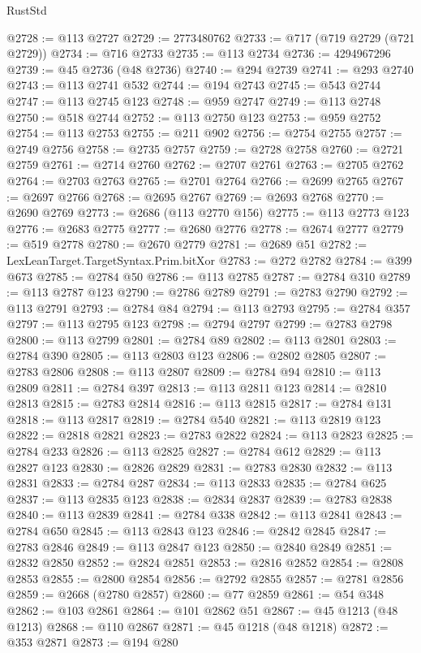 \begin{lexlean}{RustStd}
\begin{coremodule}
@2728 := @113 @2727
@2729 := 2773480762
@2733 := @717 (@719 @2729 (@721 @2729))
@2734 := @716 @2733
@2735 := @113 @2734
@2736 := 4294967296
@2739 := @45 @2736 (@48 @2736)
@2740 := @294 @2739
@2741 := @293 @2740
@2743 := @113 @2741 @532
@2744 := @194 @2743
@2745 := @543 @2744
@2747 := @113 @2745 @123
@2748 := @959 @2747
@2749 := @113 @2748
@2750 := @518 @2744
@2752 := @113 @2750 @123
@2753 := @959 @2752
@2754 := @113 @2753
@2755 := @211 @902
@2756 := @2754 @2755
@2757 := @2749 @2756
@2758 := @2735 @2757
@2759 := @2728 @2758
@2760 := @2721 @2759
@2761 := @2714 @2760
@2762 := @2707 @2761
@2763 := @2705 @2762
@2764 := @2703 @2763
@2765 := @2701 @2764
@2766 := @2699 @2765
@2767 := @2697 @2766
@2768 := @2695 @2767
@2769 := @2693 @2768
@2770 := @2690 @2769
@2773 := @2686 (@113 @2770 @156)
@2775 := @113 @2773 @123
@2776 := @2683 @2775
@2777 := @2680 @2776
@2778 := @2674 @2777
@2779 := @519 @2778
@2780 := @2670 @2779
@2781 := @2689 @51
@2782 := LexLeanTarget.TargetSyntax.Prim.bitXor
@2783 := @272 @2782
@2784 := @399 @673
@2785 := @2784 @50
@2786 := @113 @2785
@2787 := @2784 @310
@2789 := @113 @2787 @123
@2790 := @2786 @2789
@2791 := @2783 @2790
@2792 := @113 @2791
@2793 := @2784 @84
@2794 := @113 @2793
@2795 := @2784 @357
@2797 := @113 @2795 @123
@2798 := @2794 @2797
@2799 := @2783 @2798
@2800 := @113 @2799
@2801 := @2784 @89
@2802 := @113 @2801
@2803 := @2784 @390
@2805 := @113 @2803 @123
@2806 := @2802 @2805
@2807 := @2783 @2806
@2808 := @113 @2807
@2809 := @2784 @94
@2810 := @113 @2809
@2811 := @2784 @397
@2813 := @113 @2811 @123
@2814 := @2810 @2813
@2815 := @2783 @2814
@2816 := @113 @2815
@2817 := @2784 @131
@2818 := @113 @2817
@2819 := @2784 @540
@2821 := @113 @2819 @123
@2822 := @2818 @2821
@2823 := @2783 @2822
@2824 := @113 @2823
@2825 := @2784 @233
@2826 := @113 @2825
@2827 := @2784 @612
@2829 := @113 @2827 @123
@2830 := @2826 @2829
@2831 := @2783 @2830
@2832 := @113 @2831
@2833 := @2784 @287
@2834 := @113 @2833
@2835 := @2784 @625
@2837 := @113 @2835 @123
@2838 := @2834 @2837
@2839 := @2783 @2838
@2840 := @113 @2839
@2841 := @2784 @338
@2842 := @113 @2841
@2843 := @2784 @650
@2845 := @113 @2843 @123
@2846 := @2842 @2845
@2847 := @2783 @2846
@2849 := @113 @2847 @123
@2850 := @2840 @2849
@2851 := @2832 @2850
@2852 := @2824 @2851
@2853 := @2816 @2852
@2854 := @2808 @2853
@2855 := @2800 @2854
@2856 := @2792 @2855
@2857 := @2781 @2856
@2859 := @2668 (@2780 @2857)
@2860 := @77 @2859
@2861 := @54 @348
@2862 := @103 @2861
@2864 := @101 @2862 @51
@2867 := @45 @1213 (@48 @1213)
@2868 := @110 @2867
@2871 := @45 @1218 (@48 @1218)
@2872 := @353 @2871
@2873 := @194 @280

\end{coremodule}
\end{lexlean}
